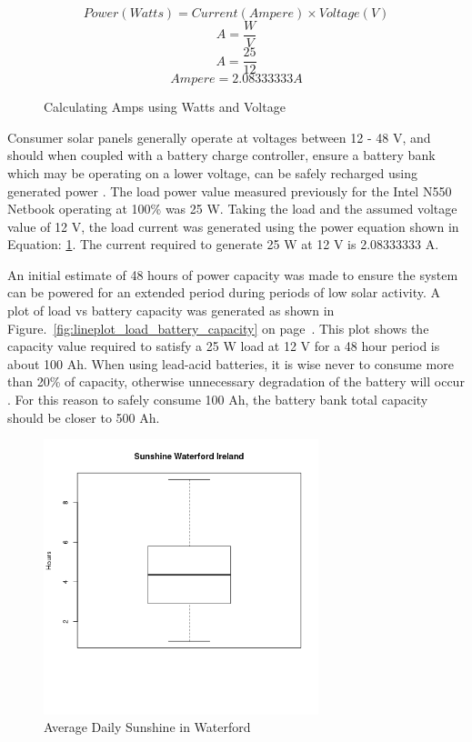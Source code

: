 %
\begin{figure}[here]
	\centering
	\begin{equation}
	Power(Watts) = Current(Ampere) \times Voltage(V)
	\end{equation}
	\begin{equation}
	A = \frac{W}{V}
	\end{equation}
	\begin{equation}
	A = \frac{25}{12}
	\end{equation}
	\begin{equation}
	Ampere = 2.08333333 A
	\end{equation}
	\caption{Calculating Amps using Watts and Voltage}
	\label{fig:power_equation}
\end{figure}
%

Consumer solar panels generally operate at voltages between 12 - 48 V, and should when coupled with a battery charge controller, ensure a battery bank which may be operating on a lower voltage, can be safely recharged using generated power \citep{bryce-11}. The load power value measured previously for the Intel N550 Netbook operating at 100\% was 25 W. Taking the load and the assumed voltage value of 12 V, the load current was generated using the power equation shown in Equation: \ref{fig:power_equation}. The current required to generate 25 W at 12 V is 2.08333333 A.

An initial estimate of 48 hours of power capacity was made to ensure the system can be powered for an extended period during periods of low solar activity. A plot of load vs battery capacity was generated as shown in Figure.~\ref{fig:lineplot_load_battery_capacity} on page~\pageref{fig:lineplot_load_battery_capacity}. This plot shows the capacity value required to satisfy a 25 W load at 12 V for a 48 hour period is about 100 Ah. When using lead-acid batteries, it is wise never to consume more than 20\% of capacity, otherwise unnecessary degradation of the battery will occur \citep{bryce-11}. For this reason to safely consume 100 Ah, the battery bank total capacity should be closer to 500 Ah.

%
\begin{figure}[!htb]
	\centering
	\includegraphics[width=8cm]{images/62}
	\caption{Average Daily Sunshine in Waterford}
	\label{fig:boxplot_hours_sunshine_waterford}
\end{figure}
%

